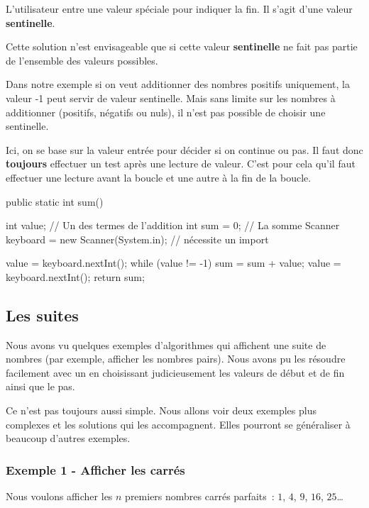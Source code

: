 		L’utilisateur entre une valeur spéciale pour indiquer la fin. Il s'agit
		d'une valeur \textbf{sentinelle}. 
		
		Cette solution n'est envisageable que si cette valeur \textbf{sentinelle} 
		ne fait pas partie de l'ensemble des valeurs possibles. 
		
		Dans notre exemple si on veut additionner des nombres positifs
		uniquement, la valeur -1 peut servir de valeur sentinelle. Mais sans
		limite sur les nombres à additionner (positifs, négatifs ou nuls), il
		n’est pas possible de choisir une sentinelle.

		Ici, on se base sur la valeur entrée pour décider si on continue ou pas.
		Il faut donc \textbf{toujours} effectuer un test après une lecture de
		valeur. C’est pour cela qu’il faut effectuer une lecture avant la boucle
		et une autre à la fin de la boucle.

		\begin{java}
public static int sum(){
	int value;			// Un des termes de l'addition
	int sum = 0;		// La somme
	Scanner keyboard = new Scanner(System.in); // nécessite un import

	value = keyboard.nextInt();
	while (value != -1){
		sum = sum + value;
		value = keyboard.nextInt();
	}
	return sum;
}	
		\end{java}

\subsection{Les suites}
\label{chap:suites}

	Nous avons vu quelques exemples d’algorithmes qui affichent une suite de
	nombres (par exemple, afficher les nombres pairs).  Nous avons pu les
	résoudre facilement avec un \pc{\algorithmicfor} en choisissant
	judicieusement les valeurs de début et de fin ainsi que le pas.
	
	Ce n’est pas toujours aussi simple.  Nous allons voir deux exemples plus
	complexes et les solutions qui les accompagnent.  Elles pourront se
	généraliser à beaucoup d’autres exemples.
	
	\subsubsection{Exemple 1 - Afficher les carrés}
	
		Nous voulons afficher les $n$ premiers nombres carrés parfaits~:
		$1$, $4$, $9$, $16$, $25$\dots

